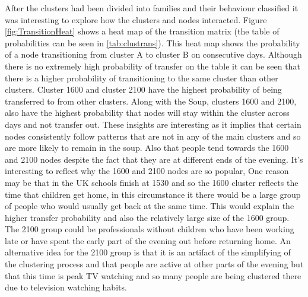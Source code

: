 After the clusters had been divided into families and their behaviour classified it was interesting to explore how the clusters and nodes interacted. Figure \ref{fig:TransitionHeat} shows a heat map of the transition matrix (the table of probabilities can be seen in \ref{tab:clustrans}). This heat map shows the probability of a node transitioning from cluster A to cluster B on consecutive days. Although there is no extremely high probability of transfer on the table it can be seen that there is a higher probability of transitioning to the same cluster than other clusters. Cluster 1600 and cluster 2100 have the highest probability of being transferred to from other clusters. 
Along with the Soup, clusters 1600 and 2100, also have the highest probability that nodes will stay within the cluster across days and not transfer out.
These insights are interesting as it implies that certain nodes consistently follow patterns that are not in any of the main clusters and so are more likely to remain in the soup. Also that people tend towards the 1600 and 2100 nodes despite the fact that they are at different ends of the evening. It's interesting to reflect why the 1600 and 2100 nodes are so popular, 
One reason may be that in the UK schools finish at 1530 and so the 1600 cluster reflects the time that children get home, in this circumstance it there would be a large group of people who would usually get back at the same time. This would explain the higher transfer probability and also the relatively large size of the 1600 group. The 2100 group could be professionals without children who have been working late or have spent the early part of the evening out before returning home. An alternative idea for the 2100 group is that it is an artifact of the simplifying of the clustering process and that people are active at other parts of the evening but that this time is peak TV watching and so many people are being clustered there due to television watching habits.


